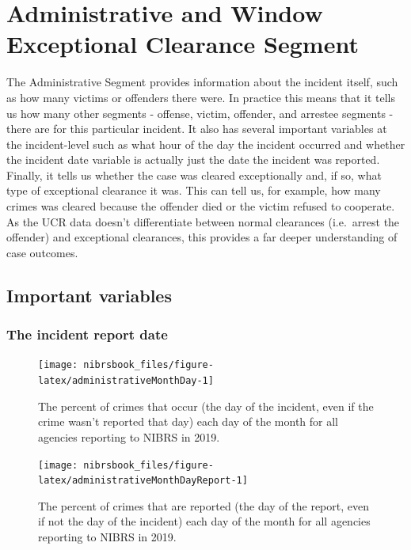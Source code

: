 \documentclass[
  12pt,
  openany]{book}
\begin{document}
\hypertarget{administrative-and-window-exceptional-clearance-segment}{%
\chapter{Administrative and Window Exceptional Clearance Segment}\label{administrative-and-window-exceptional-clearance-segment}}

The Administrative Segment provides information about the incident itself, such as how many victims or offenders there were. In practice this means that it tells us how many other segments - offense, victim, offender, and arrestee segments - there are for this particular incident. It also has several important variables at the incident-level such as what hour of the day the incident occurred and whether the incident date variable is actually just the date the incident was reported. Finally, it tells us whether the case was cleared exceptionally and, if so, what type of exceptional clearance it was. This can tell us, for example, how many crimes was cleared because the offender died or the victim refused to cooperate. As the UCR data doesn't differentiate between normal clearances (i.e.~arrest the offender) and exceptional clearances, this provides a far deeper understanding of case outcomes.

\hypertarget{important-variables}{%
\section{Important variables}\label{important-variables}}

\hypertarget{the-incident-report-date}{%
\subsection{The incident report date}\label{the-incident-report-date}}

\begin{figure}

{\centering \texttt{[image: nibrsbook\_files/figure-latex/administrativeMonthDay-1]} 

}

\caption{The percent of crimes that occur (the day of the incident, even if the crime wasn't reported that day) each day of the month for all agencies reporting to NIBRS in 2019.}\label{fig:administrativeMonthDay}
\end{figure}

\begin{figure}

{\centering \texttt{[image: nibrsbook\_files/figure-latex/administrativeMonthDayReport-1]} 

}

\caption{The percent of crimes that are reported (the day of the report, even if not the day of the incident) each day of the month for all agencies reporting to NIBRS in 2019.}\label{fig:administrativeMonthDayReport}
\end{figure}
\end{document}
